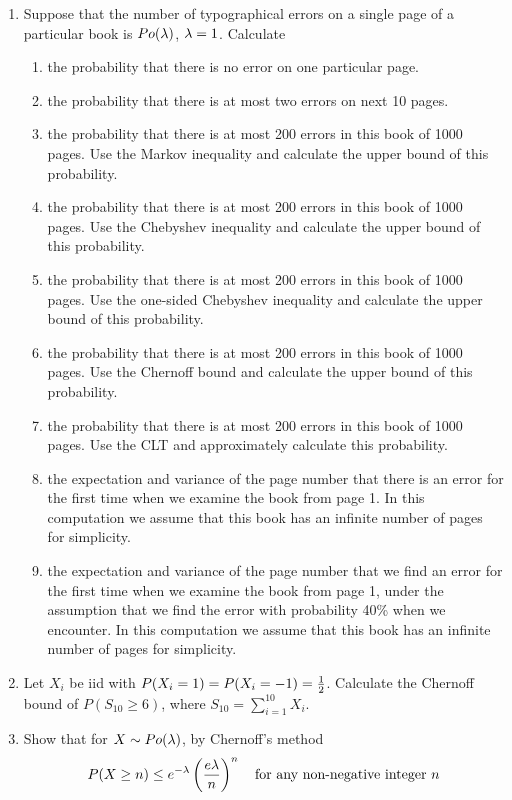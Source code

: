 \documentclass[12pt]{article}%
\newcommand{\0}{{\bf 0}}
\begin{document}
\begin{enumerate}


\item
Suppose that the number of typographical errors on a single page of a particular book is $Po(\lambda)$, $\lambda=1$. Calculate 
\begin{enumerate}
\item
the probability that there is no error on one particular page. 
\item
the probability that there is at most two errors on next 10 pages. 
\item
the probability that there is at most 200 errors in this book of 1000 pages.
Use the Markov inequality and calculate the upper bound of this probability. 
\item
the probability that there is at most 200 errors in this book of 1000 pages.
Use the Chebyshev inequality and calculate the upper bound of this probability. 
\item
the probability that there is at most 200 errors in this book of 1000 pages.
Use the one-sided Chebyshev inequality and calculate the upper bound of this probability.
\item
the probability that there is at most 200 errors in this book of 1000 pages.
Use the Chernoff bound and calculate the upper bound of this probability.
\item
the probability that there is at most 200 errors in this book of 1000 pages.
Use the CLT and approximately calculate this probability. 
\item
the expectation and variance of the page number that there is an error for the first time when we examine the book from page 1.
In this computation we assume that this book has an infinite number of pages for simplicity. 
\item
the expectation and variance of the page number that we find an error for the first time when we examine the book from page 1,
under the assumption that we find the error with probability 40\% when we encounter.
In this computation we assume that this book has an infinite number of pages for simplicity. 
\end{enumerate}




\item
Let $X_i$ be iid with $P(X_i=1)=P(X_i=-1)=\frac12$.
Calculate the Chernoff bound of $P(S_{10}\ge 6)$, where $S_{10}=\sum_{i=1}^{10}X_i$.



\item
Show that 
for $X\sim Po(\lambda)$, by Chernoff's method 
$$
P(X\ge n)\le e^{-\lambda}\left(\frac{e\lambda}{n}\right)^n\quad \mbox{for any non-negative integer $n$}
$$






\end{enumerate}
\end{document}
